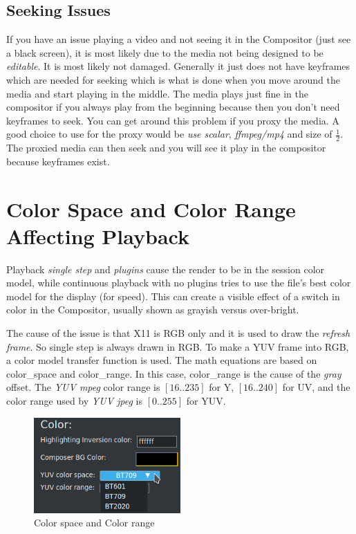 \subsection{Seeking Issues}%
\label{sub:seeking_issue}

If you have an issue playing a video and not seeing it in the Compositor (just see a black screen), it is most likely due to the media not being designed to be \textit{editable}.  It is most likely not damaged.  Generally it just does not have keyframes which are needed for seeking which is what is done when you move around the media and start playing in the middle.  The media plays just fine in the compositor if you always play from the beginning because then you don’t need keyframes to seek.  You can get around this problem if you proxy the media.  A good choice to use for the proxy would be \textit{use scalar}, \textit{ffmpeg/mp4} and size of $\frac{1}{2}$.  The proxied media can then seek and you will see it play in the compositor because keyframes exist.

\section{Color Space and Color Range Affecting Playback}%
\label{sec:color_space_range_playback}

Playback \textit{single step} and \textit{plugins} cause the render to be in the session color model, while continuous playback with no plugins tries to use the file’s best color model for the display (for speed).
This can create a visible effect of a switch in color in the Compositor, usually shown as grayish versus over-bright.

The cause of the issue is that X11 is RGB only and it is used to draw the \textit{refresh frame}.  So single step is always drawn in RGB.  To make a YUV frame into RGB, a color model transfer function is used.  The math equations are based on color\_space and color\_range.  In this case, color\_range is the cause of the \textit{gray} offset.  The \textit{YUV mpeg} color range is $[16..235]$ for Y, $[16..240]$ for UV, and the color range used by \textit{YUV jpeg} is $[0..255]$ for YUV.

\begin{figure} 
    \vspace{-5ex}
    \centering
    \includegraphics[width=0.5\textwidth,keepaspectratio]{images/color.png}
    \caption{Color space and Color range}
    \label{fig:color}
\end{figure} 

